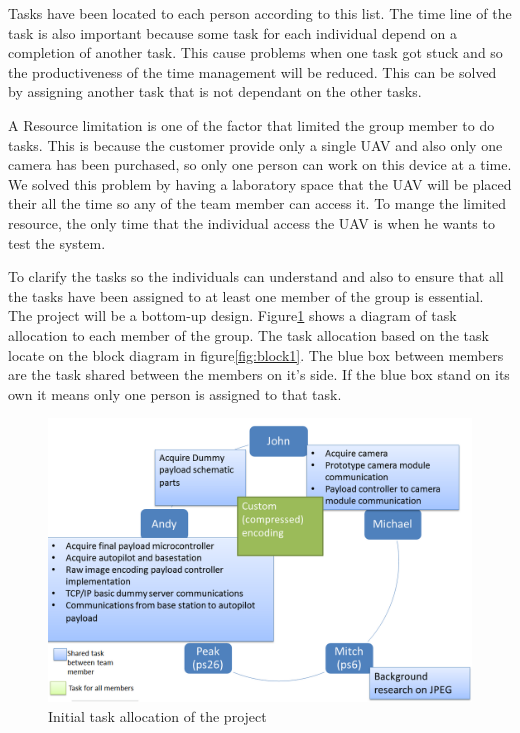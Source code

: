 Tasks have been located to each person according to this list.
The time line of the task is also important because some task for each individual depend on a completion of another task. 
This cause problems when one task got stuck and so the productiveness of the time management will be reduced. 
This can be solved by assigning another task that is not dependant on the other tasks. 

A Resource limitation is one of the factor that limited the group member to do tasks. This is because the customer provide only a single UAV and also only one camera has been purchased, so only one person can work on this device at a time. We solved this problem by having a laboratory space that the UAV will be placed their all the time so any of the team member can access it. To mange the limited resource, the only time that the individual access the UAV is when he wants to test the system. 

To clarify the tasks so the individuals can understand and also to ensure that all the tasks have been assigned to at least one member of the group is essential. 
The project will be a bottom-up design. 
Figure\ref{task allocation} shows a diagram of task allocation to each member of the group. 
The task allocation based on the task locate on the block diagram in figure\ref{fig:block1}.
The blue box between members are the task shared between the members on it's side. 
If the blue box stand on its own it means only one person is assigned to that task.

\begin{figure}[H]
\begin{center}
\includegraphics[width=1.0\textwidth]{figures/initial_task_allocation.png} 
\end{center}
\caption{Initial task allocation of the project\label{task allocation}}
\end{figure}

